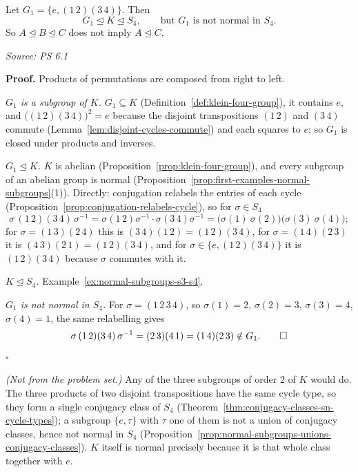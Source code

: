\documentclass[11pt]{report}
\renewenvironment{proof}[1][Proof]{\noindent\textbf{#1.} }{\hfill$\square$\par\vspace{5pt}}
\newcommand{\srcline}[1]{\par\hfill{\footnotesize\textit{Source: #1}}}
\begin{document}
\begin{exbox}\label{ex:normality-not-transitive}
Let $G_1 = \{e, (1\,2)(3\,4)\}$. Then
\[ G_1 \trianglelefteq K \trianglelefteq S_4, \qquad \text{but } G_1 \text{ is not normal in } S_4 . \]
So $A \trianglelefteq B \trianglelefteq C$ does not imply $A \trianglelefteq C$.
\srcline{PS 6.1}
\end{exbox}

\begin{proof}
Products of permutations are composed from right to left.

\emph{$G_1$ is a subgroup of $K$.} $G_1 \subseteq K$ (Definition~\ref{def:klein-four-group}), it contains $e$, and $\big((1\,2)(3\,4)\big)^2 = e$ because the disjoint transpositions $(1\,2)$ and $(3\,4)$ commute (Lemma~\ref{lem:disjoint-cycles-commute}) and each squares to $e$; so $G_1$ is closed under products and inverses.

\emph{$G_1 \trianglelefteq K$.} $K$ is abelian (Proposition~\ref{prop:klein-four-group}), and every subgroup of an abelian group is normal (Proposition~\ref{prop:first-examples-normal-subgroups}(1)). Directly: conjugation relabels the entries of each cycle (Proposition~\ref{prop:conjugation-relabels-cycle}), so for $\sigma \in S_4$
\[ \sigma\,(1\,2)(3\,4)\,\sigma^{-1} = \sigma(1\,2)\sigma^{-1}\cdot\sigma(3\,4)\sigma^{-1} = \big(\sigma(1)\ \sigma(2)\big)\big(\sigma(3)\ \sigma(4)\big); \]
for $\sigma = (1\,3)(2\,4)$ this is $(3\,4)(1\,2) = (1\,2)(3\,4)$, for $\sigma = (1\,4)(2\,3)$ it is $(4\,3)(2\,1) = (1\,2)(3\,4)$, and for $\sigma \in \{e, (1\,2)(3\,4)\}$ it is $(1\,2)(3\,4)$ because $\sigma$ commutes with it.

\emph{$K \trianglelefteq S_4$.} Example~\ref{ex:normal-subgroups-s3-s4}.

\emph{$G_1$ is not normal in $S_4$.} For $\sigma = (1\,2\,3\,4)$, so $\sigma(1) = 2$, $\sigma(2) = 3$, $\sigma(3) = 4$, $\sigma(4) = 1$, the same relabelling gives
\[ \sigma\,(1\,2)(3\,4)\,\sigma^{-1} = (2\,3)(4\,1) = (1\,4)(2\,3) \notin G_1 . \qedhere \]
\end{proof}

\textit{(Not from the problem set.)} Any of the three subgroups of order $2$ of $K$ would do. The three products of two disjoint transpositions have the same cycle type, so they form a single conjugacy class of $S_4$ (Theorem~\ref{thm:conjugacy-classes-sn-cycle-types}); a subgroup $\{e, \tau\}$ with $\tau$ one of them is not a union of conjugacy classes, hence not normal in $S_4$ (Proposition~\ref{prop:normal-subgroups-unions-conjugacy-classes}). $K$ itself is normal precisely because it is that whole class together with $e$.
\end{document}
